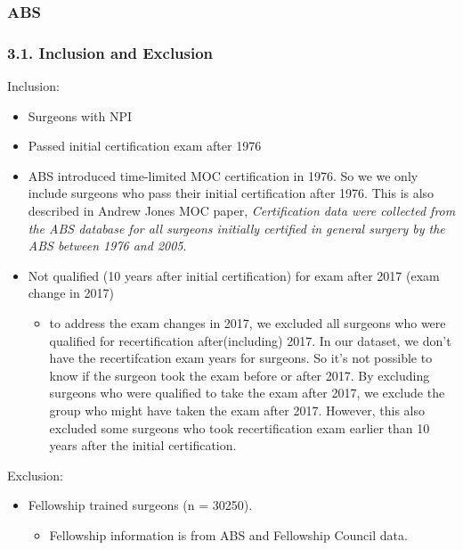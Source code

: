 \documentclass[
]{article}
\providecommand{\tightlist}{%
  \setlength{\itemsep}{0pt}\setlength{\parskip}{0pt}}
\begin{document}
\hypertarget{abs}{%
\subsubsection{ABS}\label{abs}}

\hypertarget{inclusion-and-exclusion}{%
\subsubsection{3.1. Inclusion and
Exclusion}\label{inclusion-and-exclusion}}

Inclusion:

\begin{itemize}
\tightlist
\item
  Surgeons with NPI
\item
  Passed initial certification exam after 1976
\item
  ABS introduced time-limited MOC certification in 1976. So we we only
  include surgeons who pass their initial certification after 1976. This
  is also described in Andrew Jones MOC paper, \emph{Certification data
  were collected from the ABS database for all surgeons initially
  certified in general surgery by the ABS between 1976 and 2005}.
\item
  Not qualified (10 years after initial certification) for exam after
  2017 (exam change in 2017)

  \begin{itemize}
  \tightlist
  \item
    to address the exam changes in 2017, we excluded all surgeons who
    were qualified for recertification after(including) 2017. In our
    dataset, we don't have the recertifcation exam years for surgeons.
    So it's not possible to know if the surgeon took the exam before or
    after 2017. By excluding surgeons who were qualified to take the
    exam after 2017, we exclude the group who might have taken the exam
    after 2017. However, this also excluded some surgeons who took
    recertification exam earlier than 10 years after the initial
    certification.
  \end{itemize}
\end{itemize}

Exclusion:

\begin{itemize}
\tightlist
\item
  Fellowship trained surgeons (n = 30250).

  \begin{itemize}
  \tightlist
  \item
    Fellowship information is from ABS and Fellowship Council data.
  \end{itemize}
\end{itemize}
\end{document}
